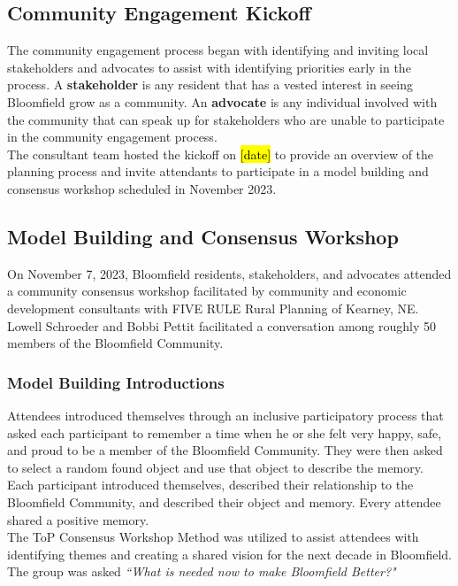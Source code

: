 \subsection{Community Engagement Kickoff}

\noindent The community engagement process began with identifying and inviting local stakeholders and advocates to assist with identifying priorities early in the process. A \textbf{\textcolor{coBalt}{stakeholder}} is any resident that has a vested interest in seeing Bloomfield grow as a community. An \textbf{\textcolor{coBalt}{advocate}} is any individual involved with the community that can speak up for stakeholders who are unable to participate in the community engagement process.\\

\noindent The consultant team hosted the kickoff on \hl{[date]} to provide an overview of the planning process and invite attendants to participate in a model building and consensus workshop scheduled in November 2023.

\subsection{Model Building and Consensus Workshop}

\noindent On November 7, 2023, Bloomfield residents, stakeholders, and advocates attended a community consensus workshop facilitated by community and economic development consultants with FIVE RULE Rural Planning of Kearney, NE. Lowell Schroeder and Bobbi Pettit facilitated a conversation among roughly 50 members of the Bloomfield Community.

\subsubsection*{Model Building Introductions}
\noindent Attendees introduced themselves through an inclusive participatory process that asked each participant to remember a time when he or she felt very happy, safe, and proud to be a member of the Bloomfield Community. They were then asked to select a random found object and use that object to describe the memory. Each participant introduced themselves, described their relationship to the Bloomfield Community, and described their object and memory. Every attendee shared a positive memory.\\

\noindent The ToP Consensus Workshop Method was utilized to assist attendees with identifying themes and creating a shared vision for the next decade in Bloomfield. The group was asked \textit{“What is needed now to make Bloomfield Better?"}\\

